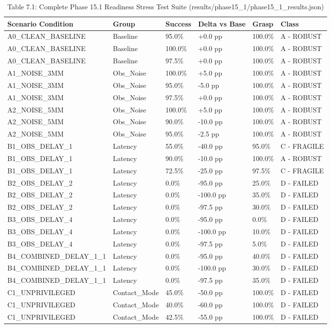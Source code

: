 \documentclass[11pt,a4paper,oneside]{book}
\begin{document}
\begin{longtable}{l l l l l l}\caption{Table 7.1: Complete Phase 15.1 Readiness Stress Test Suite (results/phase15\_1/phase15\_1\_results.json)}\\\toprule
Scenario Condition & Group & Success & Delta vs Base & Grasp & Class \\ \midrule \endhead
A0\_CLEAN\_BASELINE & Baseline & 95.0\% & +0.0 pp & 100.0\% & A - ROBUST \\
A0\_CLEAN\_BASELINE & Baseline & 100.0\% & +0.0 pp & 100.0\% & A - ROBUST \\
A0\_CLEAN\_BASELINE & Baseline & 97.5\% & +0.0 pp & 100.0\% & A - ROBUST \\
A1\_NOISE\_3MM & Obs\_Noise & 100.0\% & +5.0 pp & 100.0\% & A - ROBUST \\
A1\_NOISE\_3MM & Obs\_Noise & 95.0\% & -5.0 pp & 100.0\% & A - ROBUST \\
A1\_NOISE\_3MM & Obs\_Noise & 97.5\% & +0.0 pp & 100.0\% & A - ROBUST \\
A2\_NOISE\_5MM & Obs\_Noise & 100.0\% & +5.0 pp & 100.0\% & A - ROBUST \\
A2\_NOISE\_5MM & Obs\_Noise & 90.0\% & -10.0 pp & 100.0\% & A - ROBUST \\
A2\_NOISE\_5MM & Obs\_Noise & 95.0\% & -2.5 pp & 100.0\% & A - ROBUST \\
B1\_OBS\_DELAY\_1 & Latency & 55.0\% & -40.0 pp & 95.0\% & C - FRAGILE \\
B1\_OBS\_DELAY\_1 & Latency & 90.0\% & -10.0 pp & 100.0\% & A - ROBUST \\
B1\_OBS\_DELAY\_1 & Latency & 72.5\% & -25.0 pp & 97.5\% & C - FRAGILE \\
B2\_OBS\_DELAY\_2 & Latency & 0.0\% & -95.0 pp & 25.0\% & D - FAILED \\
B2\_OBS\_DELAY\_2 & Latency & 0.0\% & -100.0 pp & 35.0\% & D - FAILED \\
B2\_OBS\_DELAY\_2 & Latency & 0.0\% & -97.5 pp & 30.0\% & D - FAILED \\
B3\_OBS\_DELAY\_4 & Latency & 0.0\% & -95.0 pp & 0.0\% & D - FAILED \\
B3\_OBS\_DELAY\_4 & Latency & 0.0\% & -100.0 pp & 10.0\% & D - FAILED \\
B3\_OBS\_DELAY\_4 & Latency & 0.0\% & -97.5 pp & 5.0\% & D - FAILED \\
B4\_COMBINED\_DELAY\_1\_1 & Latency & 0.0\% & -95.0 pp & 40.0\% & D - FAILED \\
B4\_COMBINED\_DELAY\_1\_1 & Latency & 0.0\% & -100.0 pp & 30.0\% & D - FAILED \\
B4\_COMBINED\_DELAY\_1\_1 & Latency & 0.0\% & -97.5 pp & 35.0\% & D - FAILED \\
C1\_UNPRIVILEGED & Contact\_Mode & 45.0\% & -50.0 pp & 100.0\% & D - FAILED \\
C1\_UNPRIVILEGED & Contact\_Mode & 40.0\% & -60.0 pp & 100.0\% & D - FAILED \\
C1\_UNPRIVILEGED & Contact\_Mode & 42.5\% & -55.0 pp & 100.0\% & D - FAILED \\
\bottomrule \end{longtable}
\end{document}
